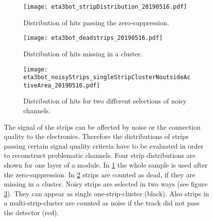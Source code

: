 \documentclass[
twoside,            %
BCOR1.4cm,          %
10pt,               %
headings=normal,    %
headsepline,        %
clearplainpage,		%
final,              %
div=14,
open=right,
bibliography=toc
]{scrreprt}
\begin{document}
\begin{figure}[!h]
	\begin{subfigure}[b]{0.32\textwidth}
		\centering
		\texttt{[image: eta3bot\_stripDistribution\_20190516.pdf]}
		\caption{Distribution of hits passing the zero-suppression.}
		\label{eta3bot_stripDistribution_20190516} 
	\end{subfigure}
	\hfill
	\begin{subfigure}[b]{0.32\textwidth}
		\centering
		\texttt{[image: eta3bot\_deadstrips\_20190516.pdf]}
		\caption{Distribution of hits missing in a cluster.}
		\label{eta3bot_deadstrips_20190516} 
	\end{subfigure}
	\hfill
	\begin{subfigure}[b]{0.32\textwidth}
		\centering
		\texttt{[image: eta3bot\_noisyStrips\_singleStripClusterNoutsideActiveArea\_20190516.pdf]}
		\caption{Distribution of hits for two different selections of noisy channels.}
		\label{eta3bot_noisyStrips_singleStripClusterNoutsideActiveArea_20190516} 
	\end{subfigure}
	\vspace{-2mm}
	\caption{
		The signal of the strips can be affected by noise or the connection quality to the electronics.
		Therefore the distributions of strips passing certain signal quality criteria have to be evaluated in order to reconstruct problematic channels.
		Four strip distributions are shown for one layer of a module.
		In \ref{eta3bot_stripDistribution_20190516} the whole sample is used after the zero-suppression.
		In \ref{eta3bot_deadstrips_20190516} strips are counted as dead, if they are missing in a cluster.
		Noisy strips are selected in two ways (see figure \ref{eta3bot_noisyStrips_singleStripClusterNoutsideActiveArea_20190516}). 
		They can appear as single one-strip-cluster (black).
		Also strips in a multi-strip-cluster are counted as noise if the track did not pass the detector (red).
	}
	\label{eta3bot_stripDistributions} 
\end{figure}
\end{document}
